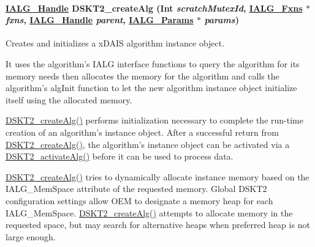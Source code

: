\hypertarget{group___d_s_p_d_s_k_t2_g5528d73c34724bc310404da0dc2fbd69}{
\paragraph[DSKT2\_\-createAlg]{\setlength{\rightskip}{0pt plus 5cm}\hyperlink{struct_i_a_l_g___obj}{IALG\_\-Handle} DSKT2\_\-create\-Alg (Int {\em scratch\-Mutex\-Id}, \hyperlink{struct_i_a_l_g___fxns}{IALG\_\-Fxns} $\ast$ {\em fxns}, \hyperlink{struct_i_a_l_g___obj}{IALG\_\-Handle} {\em parent}, \hyperlink{struct_i_a_l_g___params}{IALG\_\-Params} $\ast$ {\em params})}\hfill}
\label{group___d_s_p_d_s_k_t2_g5528d73c34724bc310404da0dc2fbd69}


Creates and initializes a x\-DAIS algorithm instance object. 

It uses the algorithm's IALG interface functions to query the algorithm for its memory needs then allocates the memory for the algorithm and calls the algorithm's alg\-Init function to let the new algorithm instance object initialize itself using the allocated memory.

\hyperlink{group___d_s_p_d_s_k_t2_g5528d73c34724bc310404da0dc2fbd69}{DSKT2\_\-create\-Alg()} performs initialization necessary to complete the run-time creation of an algorithm's instance object. After a successful return from \hyperlink{group___d_s_p_d_s_k_t2_g5528d73c34724bc310404da0dc2fbd69}{DSKT2\_\-create\-Alg()}, the algorithm's instance object can be activated via a \hyperlink{group___d_s_p_d_s_k_t2_gf946d426d6d9a95040d3967fa746cd7a}{DSKT2\_\-activate\-Alg()} before it can be used to process data.

\hyperlink{group___d_s_p_d_s_k_t2_g5528d73c34724bc310404da0dc2fbd69}{DSKT2\_\-create\-Alg()} tries to dynamically allocate instance memory based on the IALG\_\-Mem\-Space attribute of the requested memory. Global DSKT2 configuration settings allow OEM to designate a memory heap for each IALG\_\-Mem\-Space. \hyperlink{group___d_s_p_d_s_k_t2_g5528d73c34724bc310404da0dc2fbd69}{DSKT2\_\-create\-Alg()} attempts to allocate memory in the requested space, but may search for alternative heaps when preferred heap is not large enough.

